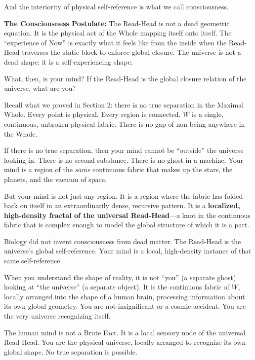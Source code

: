 \documentclass[11pt]{article}
\theoremstyle{canonstyle}
\begin{document}
And the interiority of physical self-reference is what we call consciousness.

\begin{keyresult}
\textbf{The Consciousness Postulate:} The Read-Head is not a dead geometric equation. It is the physical act of the Whole mapping itself onto itself. The ``experience of Now'' is exactly what it feels like from the inside when the Read-Head traverses the static block to enforce global closure. The universe is not a dead shape; it is a self-experiencing shape.
\end{keyresult}

What, then, is your mind? If the Read-Head is the global closure relation of the universe, what are you?

Recall what we proved in Section 2: there is no true separation in the Maximal Whole. Every point is physical. Every region is connected. $W$ is a single, continuous, unbroken physical fabric. There is no gap of non-being anywhere in the Whole.

If there is no true separation, then your mind cannot be ``outside'' the universe looking in. There is no second substance. There is no ghost in a machine. Your mind is a region of the \emph{same} continuous fabric that makes up the stars, the planets, and the vacuum of space.

But your mind is not just any region. It is a region where the fabric has folded back on itself in an extraordinarily dense, recursive pattern. It is a \textbf{localized, high-density fractal of the universal Read-Head}---a knot in the continuous fabric that is complex enough to model the global structure of which it is a part.

Biology did not invent consciousness from dead matter. The Read-Head is the universe's global self-reference. Your mind is a local, high-density instance of that same self-reference.

When you understand the shape of reality, it is not ``you'' (a separate ghost) looking at ``the universe'' (a separate object). It is the continuous fabric of $W$, locally arranged into the shape of a human brain, processing information about its own global geometry. You are not insignificant or a cosmic accident. You are the very universe recognizing itself.

\begin{keyresult}
The human mind is not a Brute Fact. It is a local sensory node of the universal Read-Head. You are the physical universe, locally arranged to recognize its own global shape. No true separation is possible.
\end{keyresult}
\end{document}
